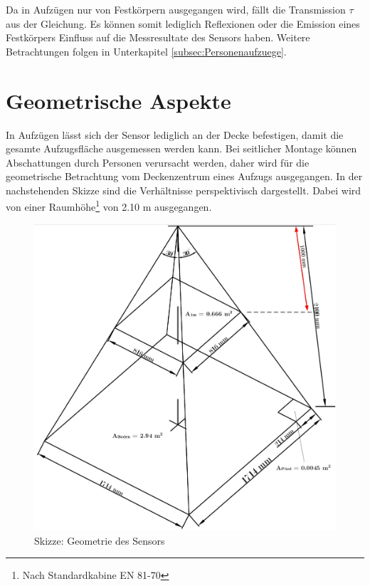 Da in Aufzügen nur von Festkörpern ausgegangen wird, fällt die Transmission $\tau$ aus der Gleichung. Es können somit lediglich Reflexionen oder die Emission eines Festkörpers Einfluss auf die Messresultate des Sensors haben. Weitere Betrachtungen folgen in Unterkapitel \ref{subsec:Personenaufzuege}.

\section{Geometrische Aspekte}
\label{sec:geometrie}

In Aufzügen lässt sich der Sensor lediglich an der Decke befestigen, damit die gesamte Aufzugsfläche ausgemessen werden kann. Bei seitlicher Montage können Abschattungen durch Personen verursacht werden, daher wird für die geometrische Betrachtung vom Deckenzentrum eines Aufzugs ausgegangen. In der nachstehenden Skizze sind die Verhältnisse perspektivisch dargestellt. Dabei wird von einer Raumhöhe\footnote[6]{Nach Standardkabine EN 81-70} von 2.10 m ausgegangen.
 
 
\begin{figure}[H]
	\centering
	\includegraphics[width=1.0\textwidth]{fig/Skizze_bearb.jpg}
	\caption[Skizze Geometrie des Sensors]{Skizze: Geometrie des Sensors}
	\label{fig:skizze}
\end{figure}

